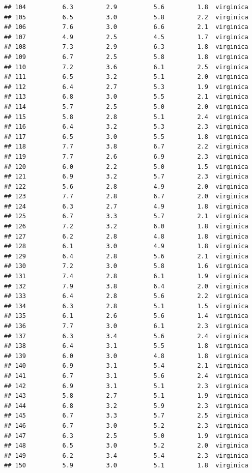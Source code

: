 \documentclass[
]{article}
\begin{document}
\begin{verbatim}
## 104          6.3         2.9          5.6         1.8  virginica
## 105          6.5         3.0          5.8         2.2  virginica
## 106          7.6         3.0          6.6         2.1  virginica
## 107          4.9         2.5          4.5         1.7  virginica
## 108          7.3         2.9          6.3         1.8  virginica
## 109          6.7         2.5          5.8         1.8  virginica
## 110          7.2         3.6          6.1         2.5  virginica
## 111          6.5         3.2          5.1         2.0  virginica
## 112          6.4         2.7          5.3         1.9  virginica
## 113          6.8         3.0          5.5         2.1  virginica
## 114          5.7         2.5          5.0         2.0  virginica
## 115          5.8         2.8          5.1         2.4  virginica
## 116          6.4         3.2          5.3         2.3  virginica
## 117          6.5         3.0          5.5         1.8  virginica
## 118          7.7         3.8          6.7         2.2  virginica
## 119          7.7         2.6          6.9         2.3  virginica
## 120          6.0         2.2          5.0         1.5  virginica
## 121          6.9         3.2          5.7         2.3  virginica
## 122          5.6         2.8          4.9         2.0  virginica
## 123          7.7         2.8          6.7         2.0  virginica
## 124          6.3         2.7          4.9         1.8  virginica
## 125          6.7         3.3          5.7         2.1  virginica
## 126          7.2         3.2          6.0         1.8  virginica
## 127          6.2         2.8          4.8         1.8  virginica
## 128          6.1         3.0          4.9         1.8  virginica
## 129          6.4         2.8          5.6         2.1  virginica
## 130          7.2         3.0          5.8         1.6  virginica
## 131          7.4         2.8          6.1         1.9  virginica
## 132          7.9         3.8          6.4         2.0  virginica
## 133          6.4         2.8          5.6         2.2  virginica
## 134          6.3         2.8          5.1         1.5  virginica
## 135          6.1         2.6          5.6         1.4  virginica
## 136          7.7         3.0          6.1         2.3  virginica
## 137          6.3         3.4          5.6         2.4  virginica
## 138          6.4         3.1          5.5         1.8  virginica
## 139          6.0         3.0          4.8         1.8  virginica
## 140          6.9         3.1          5.4         2.1  virginica
## 141          6.7         3.1          5.6         2.4  virginica
## 142          6.9         3.1          5.1         2.3  virginica
## 143          5.8         2.7          5.1         1.9  virginica
## 144          6.8         3.2          5.9         2.3  virginica
## 145          6.7         3.3          5.7         2.5  virginica
## 146          6.7         3.0          5.2         2.3  virginica
## 147          6.3         2.5          5.0         1.9  virginica
## 148          6.5         3.0          5.2         2.0  virginica
## 149          6.2         3.4          5.4         2.3  virginica
## 150          5.9         3.0          5.1         1.8  virginica
\end{verbatim}
\end{document}
